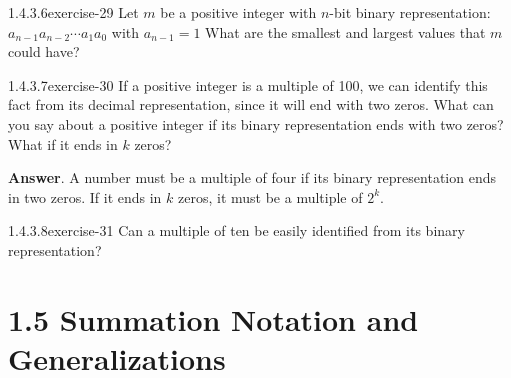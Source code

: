 \documentclass[twoside,10pt,]{book}
\numberwithin{equation}{section}
\begin{document}
\begin{divisionsolution}{1.4.3.6}{}{exercise-29}%
\hypertarget{p-472}{}%
Let \(m\) be a positive integer with \(n\)-bit binary representation: \(a_{n-1}a_{n-2}\cdots  a_1a_0\) with \(a_{n-1}=1\) What are the smallest and largest values that \(m\) could have?%
\end{divisionsolution}%
\begin{divisionsolution}{1.4.3.7}{}{exercise-30}%
\hypertarget{p-473}{}%
If a positive integer is a multiple of 100, we can identify this fact from its decimal representation, since it will end with two zeros. What can you say about a positive integer if its binary representation ends with two zeros? What if it ends in \(k\) zeros?%
\par\smallskip%
\noindent\textbf{Answer}.\quad%
\hypertarget{p-474}{}%
A number must be a multiple of four if its binary representation ends in two zeros. If it ends in \(k\) zeros, it must be a multiple of \(2^k\).%
\end{divisionsolution}%
\begin{divisionsolution}{1.4.3.8}{}{exercise-31}%
\hypertarget{p-475}{}%
Can a multiple of ten be easily identified from its binary representation?%
\end{divisionsolution}%
\section*{1.5 Summation Notation and Generalizations}
\end{document}
